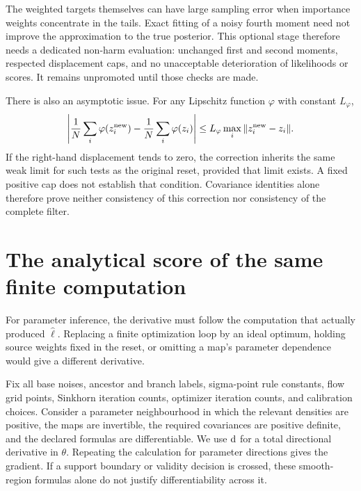 The weighted targets themselves can have large sampling error when
importance weights concentrate in the tails. Exact fitting of a noisy
fourth moment need not improve the approximation to the true posterior.
This optional stage therefore needs a dedicated non-harm evaluation:
unchanged first and second moments, respected displacement caps, and
no unacceptable deterioration of likelihoods or scores. It remains
unpromoted until those checks are made.

There is also an asymptotic issue. For any Lipschitz function \(\varphi\)
with constant \(L_\varphi\),
\begin{equation}
\label{eq:bf-covariance-proposal-weak-displacement}
 \left|\frac1N\sum_i\varphi(z_i^{\rm new})
       -\frac1N\sum_i\varphi(z_i)\right|
 \leq L_\varphi\max_i\|z_i^{\rm new}-z_i\|.
\end{equation}
If the right-hand displacement tends to zero, the correction inherits
the same weak limit for such tests as the original reset, provided that
limit exists. A fixed positive cap does not establish that condition.
Covariance identities alone therefore prove neither consistency of this
correction nor consistency of the complete filter.


\section{The analytical score of the same finite computation}
\label{sec:bf-covariance-proposal-analytical-score}

For parameter inference, the derivative must follow the computation that
actually produced \(\widehat\ell\). Replacing a finite optimization loop by
an ideal optimum, holding source weights fixed in the reset, or omitting
a map's parameter dependence would give a different derivative.

Fix all base noises, ancestor and branch labels, sigma-point rule constants,
flow grid points, Sinkhorn iteration counts, optimizer iteration counts,
and calibration choices. Consider a parameter neighbourhood in which the
relevant densities are positive, the maps are invertible, the required
covariances are positive definite, and the declared formulas are
differentiable. We use \(\mathrm d\) for a total directional derivative in
\(\theta\). Repeating the calculation for parameter directions gives the
gradient. If a support boundary or validity decision is crossed, these
smooth-region formulas alone do not justify differentiability across it.

